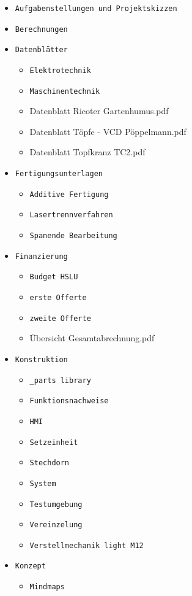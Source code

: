 \begin{appendix}
\begin{itemize}
	\item \verb|Aufgabenstellungen und Projektskizzen|
	\item \verb|Berechnungen|
	\item \verb|Datenblätter|
	\begin{itemize}
		\item \verb|Elektrotechnik|
		\item \verb|Maschinentechnik|
		\item Datenblatt Ricoter Gartenhumus.pdf
		\item Datenblatt Töpfe - VCD Pöppelmann.pdf
		\item Datenblatt Topfkranz TC2.pdf
	\end{itemize}	
	\item \verb|Fertigungsunterlagen|
	\begin{itemize}
		\item \verb|Additive Fertigung|
		\item \verb|Lasertrennverfahren|
		\item \verb|Spanende Bearbeitung|
	\end{itemize}	
	\item \verb|Finanzierung|
	\begin{itemize}
		\item \verb|Budget HSLU|
		\item \verb|erste Offerte|
		\item \verb|zweite Offerte|
		\item Übersicht Gesamtabrechnung.pdf
	\end{itemize}
	\item \verb|Konstruktion|
	\begin{itemize}
		\item \verb|_parts library|
		\item \verb|Funktionsnachweise|
		\item \verb|HMI|
		\item \verb|Setzeinheit|
		\item \verb|Stechdorn|
		\item \verb|System|
		\item \verb|Testumgebung|
		\item \verb|Vereinzelung|
		\item \verb|Verstellmechanik light M12|
	\end{itemize}
	\item \verb|Konzept|
	\begin{itemize}
		\item \verb|Mindmaps|

\end{itemize}
\end{itemize}
\end{appendix}
